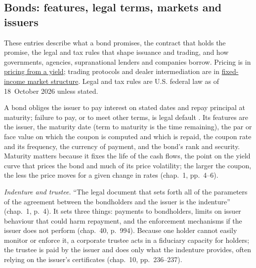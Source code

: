 \subsection{Bonds: features, legal terms, markets and issuers}

These entries describe what a bond promises, the contract that holds the promise, the legal and tax rules that shape issuance and trading, and how governments, agencies, supranational lenders and companies borrow. Pricing is in \hyperref[meth:bond-price-from-yield]{pricing from a yield}; trading protocols and dealer intermediation are in \hyperref[def:fixed-income-market-structure]{fixed-income market structure}. Legal and tax rules are U.S. federal law as of 18~October 2026 unless stated.

\begin{qfdefinition}\label{def:bond-features-indenture}
 A bond obliges the issuer to pay interest on stated dates and repay principal at maturity; failure to pay, or to meet other terms, is legal default \citep[chap.~10, p.~235]{s7-fabozzifixed}. Its features are the issuer, the maturity date (term to maturity is the time remaining), the par or face value on which the coupon is computed and which is repaid, the coupon rate and its frequency, the currency of payment, and the bond's rank and security. Maturity matters because it fixes the life of the cash flows, the point on the yield curve that prices the bond and much of its price volatility; the larger the coupon, the less the price moves for a given change in rates (chap.~1, pp.~4--6).

\emph{Indenture and trustee.} ``The legal document that sets forth all of the parameters of the agreement between the bondholders and the issuer is the indenture'' (chap.~1, p.~4). It sets three things: payments to bondholders, limits on issuer behaviour that could harm repayment, and the enforcement mechanisms if the issuer does not perform (chap.~40, p.~994). Because one holder cannot easily monitor or enforce it, a corporate trustee acts in a fiduciary capacity for holders; the trustee is paid by the issuer and does only what the indenture provides, often relying on the issuer's certificates (chap.~10, pp.~236--237).


\end{qfdefinition}
